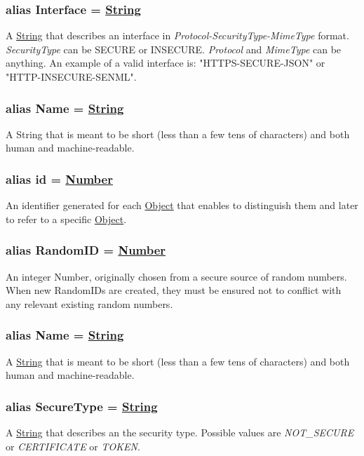 \documentclass[a4paper]{arrowhead}
\newcommand{\pdef}[1]{{\textcolor{ArrowheadGrey}{#1 \label{sec:model:primitives:#1} \label{sec:model:primitives:#1s}}}}
\newcommand{\pref}[1]{{\textcolor{ArrowheadGrey}{\hyperref[sec:model:primitives:#1]{#1}}}}
\begin{document}
\subsubsection{alias \pdef{Interface} = \pref{String}}

A \pref{String} that describes an interface in \textit{Protocol-SecurityType-MimeType} format. \textit{SecurityType} can be SECURE or INSECURE. \textit{Protocol} and \textit{MimeType} can be anything. An example of a valid interface is: "HTTPS-SECURE-JSON" or "HTTP-INSECURE-SENML".

\subsubsection{alias \pdef{Name} = \pref{String}}

A String that is meant to be short (less than a few tens of characters) and both human and machine-readable.

\subsubsection{alias \pdef{id} = \pref{Number}}

An identifier generated for each \pref{Object} that enables to distinguish them and later to refer to a specific \pref{Object}.

\subsubsection{alias \pdef{RandomID} = \pref{Number}}

An integer Number, originally chosen from a secure source of random numbers. When new RandomIDs are created, they must be ensured not to conflict with any relevant existing random numbers.

\subsubsection{alias \pdef{Name} = \pref{String}}

A \pref{String} that is meant to be short (less than a few tens of characters) and both human and machine-readable.

\subsubsection{alias \pdef{SecureType} = \pref{String}}

A \pref{String} that describes an the security type. Possible values are \textit{NOT\_SECURE} or \textit{CERTIFICATE} or \textit{TOKEN}.
\end{document}
